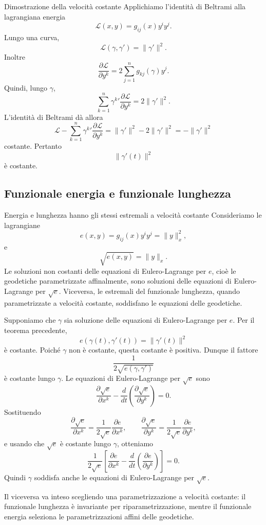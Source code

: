 \documentclass[a4paper]{article}
\begin{document}
\begin{snippetproof}{Dimostrazione della velocità costante}
Applichiamo l'identità di Beltrami alla lagrangiana energia
\[
    \mathscr{L}(x,y)=g_{ij}(x)y^i y^j.
\]
Lungo una curva,
\[
    \mathscr{L}(\gamma,\gamma')
    =
    \|\gamma'\|^2.
\]
Inoltre
\[
    \frac{\partial\mathscr{L}}{\partial y^k}
    =
    2\sum_{j=1}^{n}g_{kj}(\gamma)y^j.
\]
Quindi, lungo \(\gamma\),
\[
    \sum_{k=1}^{n}
    \gamma^k{}'
    \frac{\partial\mathscr{L}}{\partial y^k}
    =
    2\|\gamma'\|^2.
\]
L'identità di Beltrami dà allora
\[
    \mathscr{L}
    -
    \sum_{k=1}^{n}
    \gamma^k{}'
    \frac{\partial\mathscr{L}}{\partial y^k}
    =
    \|\gamma'\|^2-2\|\gamma'\|^2
    =
    -\|\gamma'\|^2
\]
costante. Pertanto
\[
    \|\gamma'(t)\|^2
\]
è costante.
\end{snippetproof}

\subsection{Funzionale energia e funzionale lunghezza}

\begin{snippetproposition}{Energia e lunghezza hanno gli stessi estremali a velocità costante}
Consideriamo le lagrangiane
\[
    e(x,y)=g_{ij}(x)y^i y^j=\|y\|_x^2,
\]
e
\[
    \sqrt{e(x,y)}=\|y\|_x.
\]
Le soluzioni non costanti delle equazioni di Eulero-Lagrange per \(e\), cioè le geodetiche parametrizzate affinalmente, sono soluzioni delle equazioni di Eulero-Lagrange per \(\sqrt e\). Viceversa, le estremali del funzionale lunghezza, quando parametrizzate a velocità costante, soddisfano le equazioni delle geodetiche.
\end{snippetproposition}

\begin{snippetproof}{}
Supponiamo che \(\gamma\) sia soluzione delle equazioni di Eulero-Lagrange per \(e\). Per il teorema precedente,
\[
    e(\gamma(t),\gamma'(t))
    =
    \|\gamma'(t)\|^2
\]
è costante. Poiché \(\gamma\) non è costante, questa costante è positiva. Dunque il fattore
\[
    \frac1{2\sqrt{e(\gamma,\gamma')}}
\]
è costante lungo \(\gamma\). Le equazioni di Eulero-Lagrange per \(\sqrt e\) sono
\[
    \frac{\partial\sqrt e}{\partial x^k}
    -
    \frac{d}{dt}
    \left(
        \frac{\partial\sqrt e}{\partial y^k}
    \right)
    =0.
\]
Sostituendo
\[
    \frac{\partial\sqrt e}{\partial x^k}
    =
    \frac1{2\sqrt e}\frac{\partial e}{\partial x^k},
    \qquad
    \frac{\partial\sqrt e}{\partial y^k}
    =
    \frac1{2\sqrt e}\frac{\partial e}{\partial y^k},
\]
e usando che \(\sqrt e\) è costante lungo \(\gamma\), otteniamo
\[
    \frac1{2\sqrt e}
    \left[
        \frac{\partial e}{\partial x^k}
        -
        \frac{d}{dt}
        \left(
            \frac{\partial e}{\partial y^k}
        \right)
    \right]
    =0.
\]
Quindi \(\gamma\) soddisfa anche le equazioni di Eulero-Lagrange per \(\sqrt e\).

Il viceversa va inteso scegliendo una parametrizzazione a velocità costante: il funzionale lunghezza è invariante per riparametrizzazione, mentre il funzionale energia seleziona le parametrizzazioni affini delle geodetiche.
\end{snippetproof}
\end{document}
